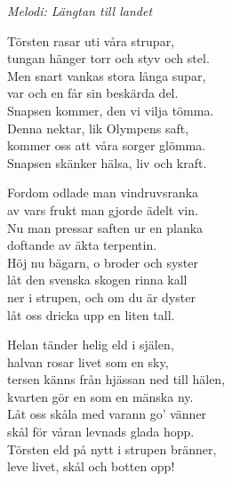 {\footnotesize\textit{Melodi: Längtan till landet}}\par
\vspace{10pt}
Törsten rasar uti våra strupar,\\
tungan hänger torr och styv och stel.\\
Men snart vankas stora långa supar,\\
var och en får sin beskärda del.\\
Snapsen kommer, den vi vilja tömma.\\
Denna nektar, lik Olympens saft,\\
kommer oss att våra sorger glömma.\\
Snapsen skänker hälsa, liv och kraft.\par
\vspace{10pt}
Fordom odlade man vindruvsranka\\
av vars frukt man gjorde ädelt vin.\\
Nu man pressar saften ur en planka\\
doftande av äkta terpentin.\\
Höj nu bägarn, o broder och syster\\
låt den svenska skogen rinna kall\\
ner i strupen, och om du är dyster\\
låt oss dricka upp en liten tall.\par
\vspace{10pt}
Helan tänder helig eld i själen,\\
halvan rosar livet som en sky,\\
tersen känns från hjässan ned till hälen,\\
kvarten gör en som en mänska ny.\\
Låt oss skåla med varann go' vänner\\
skål för våran levnads glada hopp.\\
Törsten eld på nytt i strupen bränner,\\
leve livet, skål och botten opp!
